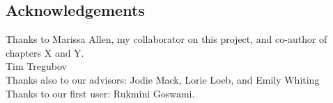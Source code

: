 \pagestyle{plain}
\begin{center}


\section*{Acknowledgements}

Thanks to Marissa Allen, my collaborator on this project, and co-author of chapters X and Y. \\
Tim Tregubov \\
Thanks also to our advisors: Jodie Mack, Lorie Loeb, and Emily Whiting \\
Thanks to our first user: Rukmini Goswami. \\

\end{center}



\cleardoublepage
